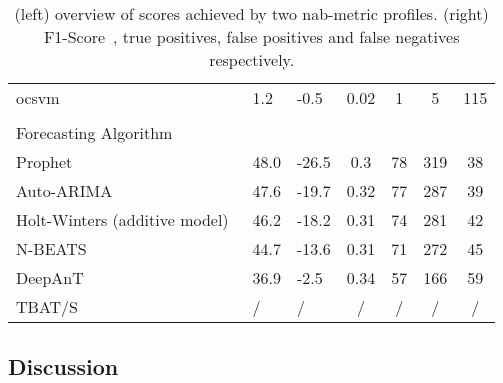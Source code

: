 \begin{table}[h]
{\begin{tabular}{lll|cccc}
            \acrshort{ocsvm}~\cite{Schölkopf.1999,Tax.2004}                 & 1.2               & -0.5              & 0.02    & 1     & 5     & 115   \\
            \\
            Forecasting Algorithm                                           &                   &                   &         &       &       &       \\\hline
            Prophet~\cite{Taylor.2017}                                      & 48.0              & -26.5             & 0.3     & 78    & 319   & 38    \\
            Auto-ARIMA~\cite{Smith.2017}                                    & 47.6              & -19.7             & 0.32    & 77    & 287   & 39    \\
            Holt-Winters (additive model)~\cite{Winters.1960}               & 46.2              & -18.2             & 0.31    & 74    & 281   & 42    \\
            N-BEATS~\cite{Oreshkin.2020}                                    & 44.7              & -13.6             & 0.31    & 71    & 272   & 45    \\
            DeepAnT~\cite{Munir.2019}                                       & 36.9              & -2.5              & 0.34    & 57    & 166   & 59    \\
            TBAT/S                                                          & /                 & /                 & /     & /     & /     & /     \\
        \end{tabular}
    }
    \caption[NAB-Scores achieved by the algorithms]{
    (left) overview of scores achieved by two \gls{nab}-metric profiles.
    (right) F1-Score~\cite[183]{Murphy.2012}, true positives, false positives
    and false negatives respectively.}\label{tab:results}
\end{table}


\subsection{Discussion}\label{subsect:discussion}
